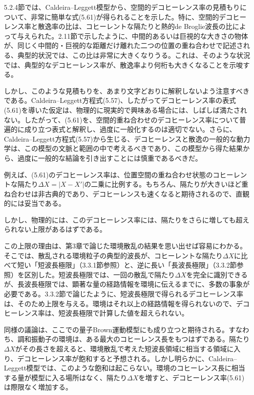 5.2.4節では、Caldeira--Leggett模型から、空間的デコヒーレンス率の見積もりについて、非常に簡単な式(5.61)が得られることを示した。特に、空間的デコヒーレンス率と散逸率の比は、コヒーレントな隔たりと熱的de Broglie波長の比によって与えられた。2.11節で示したように、中間的あるいは巨視的な大きさの物体が、同じく中間的・巨視的な距離だけ離れた二つの位置の重ね合わせで記述される、典型的状況では、この比は非常に大きくなりうる。これは、そのような状況では、典型的なデコヒーレンス率が、散逸率より何桁も大きくなることを示唆する。

しかし、このような見積もりを、あまり文字どおりに解釈しないよう注意すべきである。Caldeira--Leggett方程式(5.57)、したがってデコヒーレンス率の表式(5.61)を導いた仮定は、物理的に現実的で興味ある場合には、しばしば満たされない\cite{ref162,ref228,ref229}。したがって、(5.61)を、空間的重ね合わせのデコヒーレンス率について普遍的に成り立つ表式と解釈し、過度に一般化するのは適切でない。さらに、Caldeira--Leggett方程式(5.57)から生じる、デコヒーレンスと散逸の一般的な動力学は、この模型の文脈と範囲の中で考えるべきであり、この模型から得た結果から、過度に一般的な結論を引き出すことには慎重であるべきだ。

例えば、(5.61)のデコヒーレンス率は、位置空間の重ね合わせ状態のコヒーレントな隔たり$\Delta X=|X-X'|$の二乗に比例する。もちろん、隔たりが大きいほど重ね合わせは非古典的であり、デコヒーレンスも速くなると期待されるので、直観的には妥当である。

\hypertarget{srcpage:204}{}\label{srcpage:204}
しかし、物理的には、このデコヒーレンス率には、隔たりをさらに増しても超えられない上限があるはずである。

この上限の理由は、第3章で論じた環境散乱の結果を思い出せば容易にわかる。そこでは、散乱される環境粒子の典型的波長が、コヒーレントな隔たり$\Delta X$に比べて短い「短波長極限」（3.3.1節参照）と、逆に長い「長波長極限」（3.3.2節参照）を区別した。短波長極限では、一回の散乱で隔たり$\Delta X$を完全に識別できるが、長波長極限では、顕著な量の経路情報を環境に伝えるまでに、多数の事象が必要である。3.3.2節で論じたように、短波長極限で得られるデコヒーレンス率は、そのため上限を与える。環境はそれ以上の経路情報を得られないので、デコヒーレンス率は、短波長極限で計算した値を超えられない。

同様の議論は、ここでの量子Brown運動模型にも成り立つと期待される。すなわち、調和振動子の環境は、ある最大のコヒーレンス長をもつはずである。隔たり$\Delta X$がその長さを超えると、環境散乱で考えた短波長領域に相当する領域に入り、デコヒーレンス率が飽和すると予想される。しかし明らかに、Caldeira--Leggett模型では、このような飽和は起こらない。環境のコヒーレンス長に相当する量が模型に入る場所はなく、隔たり$\Delta X$を増すと、デコヒーレンス率(5.61)は際限なく増加する。

